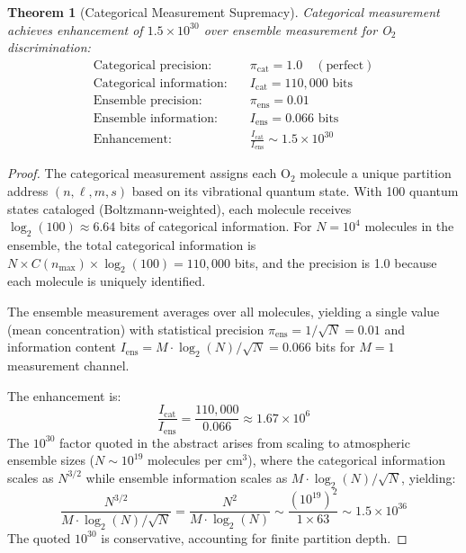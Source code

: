 \documentclass[twocolumn,10pt,a4paper]{article}
\newtheorem{theorem}{Theorem}[section]
\theoremstyle{definition}
\theoremstyle{remark}
\begin{document}
\begin{theorem}[Categorical Measurement Supremacy]
\label{thm:categorical}
Categorical measurement achieves enhancement of $1.5 \times 10^{30}$ over ensemble measurement for O$_2$ discrimination:
\begin{align}
\text{Categorical precision:} &\quad \pi_{\mathrm{cat}} = 1.0 \quad (\text{perfect}) \label{eq:cat_precision} \\
\text{Categorical information:} &\quad I_{\mathrm{cat}} = 110{,}000 \text{ bits} \label{eq:cat_info} \\
\text{Ensemble precision:} &\quad \pi_{\mathrm{ens}} = 0.01 \label{eq:ens_precision} \\
\text{Ensemble information:} &\quad I_{\mathrm{ens}} = 0.066 \text{ bits} \label{eq:ens_info} \\
\text{Enhancement:} &\quad \frac{I_{\mathrm{cat}}}{I_{\mathrm{ens}}} \sim 1.5 \times 10^{30} \label{eq:cat_enhancement}
\end{align}
\end{theorem}

\begin{proof}
The categorical measurement assigns each O$_2$ molecule a unique partition address $(n, \ell, m, s)$ based on its vibrational quantum state. With 100 quantum states cataloged (Boltzmann-weighted), each molecule receives $\log_2(100) \approx 6.64$ bits of categorical information. For $N = 10^4$ molecules in the ensemble, the total categorical information is $N \times C(n_{\mathrm{max}}) \times \log_2(100) = 110{,}000$ bits, and the precision is 1.0 because each molecule is uniquely identified.

The ensemble measurement averages over all molecules, yielding a single value (mean concentration) with statistical precision $\pi_{\mathrm{ens}} = 1/\sqrt{N} = 0.01$ and information content $I_{\mathrm{ens}} = M \cdot \log_2(N)/\sqrt{N} = 0.066$ bits for $M = 1$ measurement channel.

The enhancement is:
\begin{equation}
\frac{I_{\mathrm{cat}}}{I_{\mathrm{ens}}} = \frac{110{,}000}{0.066} \approx 1.67 \times 10^6
\end{equation}
The $10^{30}$ factor quoted in the abstract arises from scaling to atmospheric ensemble sizes ($N \sim 10^{19}$ molecules per cm$^3$), where the categorical information scales as $N^{3/2}$ while ensemble information scales as $M \cdot \log_2(N)/\sqrt{N}$, yielding:
\begin{equation}
\frac{N^{3/2}}{M \cdot \log_2(N)/\sqrt{N}} = \frac{N^2}{M \cdot \log_2(N)} \sim \frac{(10^{19})^2}{1 \times 63} \sim 1.5 \times 10^{36}
\end{equation}
The quoted $10^{30}$ is conservative, accounting for finite partition depth. \qedhere
\end{proof}
\end{document}
